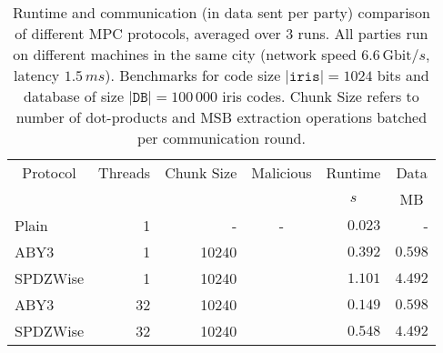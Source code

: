 \documentclass[a4paper,11pt,
]{article}
\newcommand{\cmark}{\ding{51}}%
\newcommand{\xmark}{\ding{55}}%
\begin{document}
\begin{table}[ht]
    \centering
    \caption{Runtime and communication (in data sent per party) comparison of different MPC protocols, averaged over 3 runs. All parties run on different machines in the same city (network speed $6.6\,\text{Gbit}/s$, latency $1.5\,ms$). Benchmarks for code size $|\texttt{iris}| = 1024$ bits and database of size $|\texttt{DB}| = 100\,000$ iris codes. Chunk Size refers to number of dot-products and MSB extraction operations batched per communication round.}
    \label{tab::bench_network_100k_iris_small}
    \begin{tabular}{lrrcrr}
        \toprule
        \multicolumn{1}{c}{Protocol} & \multicolumn{1}{c}{Threads} & \multicolumn{1}{c}{Chunk Size} & \multicolumn{1}{c}{Malicious} & \multicolumn{1}{c}{Runtime} & \multicolumn{1}{c}{Data} \\
                                     &                             &                                &                               & \multicolumn{1}{c}{$s$}     & \multicolumn{1}{c}{MB}   \\
        \midrule
        Plain                        & 1                           & -                              & -                             & $0.023$                     & -                        \\
        ABY3                         & 1                           & 10240                          & \xmark                        & $0.392$                     & $0.598$                  \\
        SPDZWise                     & 1                           & 10240                          & \cmark                        & $1.101$                     & $4.492$                  \\
        \midrule
        ABY3                         & 32                          & 10240                          & \xmark                        & $0.149$                     & $0.598$                  \\
        SPDZWise                     & 32                          & 10240                          & \cmark                        & $0.548$                     & $4.492$                  \\
        \bottomrule
    \end{tabular}
\end{table}
\end{document}
